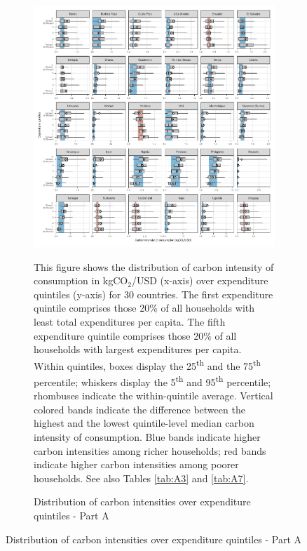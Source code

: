 \begin{figure}[ht!]
  \centering
  \caption{Distribution of carbon intensities over expenditure quintiles} \label{fig:Quint}
  \begin{subfigure}[b]{\textwidth}
  \centering
  \includegraphics{1_Figures/Figures_Appendix/Figure_1_2017_Appendix_1.pdf}
  \caption{Distribution of carbon intensities over expenditure quintiles - Part A} \label{fig:Quint_A}
  \begin{subcaption2}
    This figure shows the distribution of carbon intensity of consumption in kgCO$_{2}$/USD (x-axis) over expenditure quintiles (y-axis) for 30 countries. The first expenditure quintile comprises those 20\% of all households with least total expenditures per capita. The fifth expenditure quintile comprises those 20\% of all households with largest expenditures per capita. Within quintiles, boxes display the 25\textsuperscript{th} and the 75\textsuperscript{th} percentile; whiskers display the 5\textsuperscript{th} and 95\textsuperscript{th} percentile; rhombuses indicate the within-quintile average. Vertical colored bands indicate the difference between the highest and the lowest quintile-level median carbon intensity of consumption. Blue bands indicate higher carbon intensities among richer households; red bands indicate higher carbon intensities among poorer households. See also Tables \ref{tab:A3} and \ref{tab:A7}.
  \end{subcaption2}
  \end{subfigure}
\end{figure}

